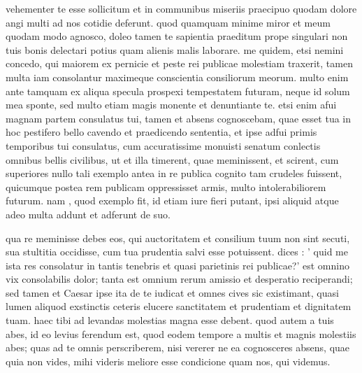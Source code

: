 


 vehementer te esse sollicitum et in communibus miseriis praecipuo quodam dolore angi multi ad nos cotidie deferunt. quod quamquam minime miror et meum quodam modo agnosco, doleo tamen te sapientia praeditum prope singulari non tuis bonis delectari potius quam alienis malis laborare. me quidem, etsi nemini concedo, qui maiorem ex pernicie et peste rei publicae molestiam traxerit, tamen multa iam consolantur maximeque conscientia consiliorum meorum. multo enim ante tamquam ex aliqua specula prospexi tempestatem futuram, neque id solum mea sponte, sed multo etiam magis monente et denuntiante te. etsi enim afui magnam partem consulatus tui, tamen et absens cognoscebam, quae esset tua in hoc pestifero bello cavendo et praedicendo sententia, et ipse adfui primis temporibus tui consulatus, cum accuratissime monuisti senatum conlectis omnibus bellis civilibus, ut et illa timerent, quae meminissent, et scirent, cum superiores nullo tali exemplo antea in re publica cognito tam crudeles fuissent, quicumque postea rem publicam oppressisset armis, multo intolerabiliorem futurum. nam , quod exemplo fit, id etiam iure fieri putant, ipsi aliquid atque adeo multa addunt et adferunt de suo.

 qua re meminisse debes eos, qui auctoritatem et consilium tuum non sint secuti, sua stultitia occidisse, cum tua prudentia salvi esse potuissent. dices : ' quid me ista res consolatur in tantis tenebris et quasi parietinis rei publicae?' est omnino vix consolabilis dolor; tanta est omnium rerum amissio et desperatio reciperandi; sed tamen et Caesar ipse ita de te iudicat et omnes cives sic existimant, quasi lumen aliquod exstinctis ceteris elucere sanctitatem et prudentiam et dignitatem tuam. haec tibi ad levandas molestias magna esse debent. quod autem a tuis abes, id eo levius ferendum est, quod eodem tempore a multis et magnis molestiis abes; quas ad te omnis perscriberem, nisi vererer ne ea cognosceres absens, quae quia non vides, mihi videris meliore esse condicione quam nos, qui videmus.


